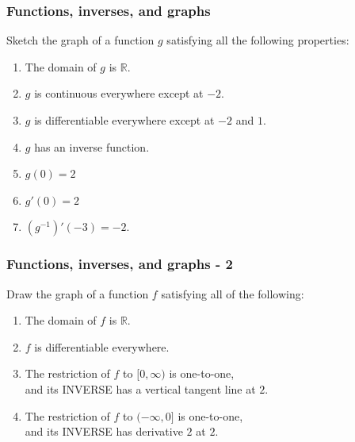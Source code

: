 \documentclass[14pt]{beamer}
\newcommand {\DS} [1] {${\displaystyle #1}$}
\newcommand {\R}{\mathbb{R}}
\begin{document}
\begin{frame}[t]
\frametitle{Functions, inverses, and graphs }

Sketch the graph of a function $g$ satisfying all the following properties:

\begin{enumerate}
	\item  The domain of $g$ is $\R$.
	\item $g$ is continuous everywhere except at $-2$.
	\item $g$ is differentiable everywhere except at $-2$ and $1$.
	\item  $g$ has an inverse function.
	\item  $g(0)=2$
	\item $g'(0) = 2$
	\item \DS{\left(g^{-1}\right)' (-3) = -2}.
\end{enumerate}

\end{frame}

\begin{frame}[t]
\frametitle{Functions, inverses, and graphs - 2}

Draw the graph of a function $f$ satisfying all of the following:

	\begin{enumerate}
		\item The domain of $f$ is $\R$.
		\item $f$ is differentiable everywhere.
		\item The restriction of $f$ to \DS{[0, \infty)} is one-to-one,  \\ and its INVERSE has a vertical tangent line at $2$.
		\item The restriction of $f$ to \DS{(- \infty,0]} is one-to-one,  \\ and its INVERSE has derivative $2$ at $2$.
	\end{enumerate}

\end{frame}
\end{document}

